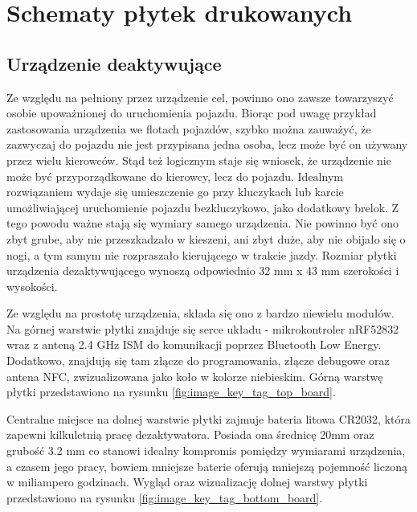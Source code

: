 \chapter{Schematy płytek drukowanych}
\label{boards}

\section{Urządzenie deaktywujące}

Ze względu na pełniony przez urządzenie cel, powinno ono zawsze towarzyszyć osobie upoważnionej do uruchomienia pojazdu. Biorąc pod uwagę przykład zastosowania urządzenia we flotach pojazdów, szybko można zauważyć, że zazwyczaj do pojazdu nie jest przypisana jedna osoba, lecz może być on używany przez wielu kierowców. Stąd też logicznym staje się wniosek, że urządzenie nie może być przyporządkowane do kierowcy, lecz do pojazdu. Idealnym rozwiązaniem wydaje się umieszczenie go przy kluczykach lub karcie umożliwiającej uruchomienie pojazdu bezkluczykowo, jako dodatkowy brelok. Z tego powodu ważne stają się wymiary samego urządzenia. Nie powinno być ono zbyt grube, aby nie przeszkadzało w kieszeni, ani zbyt duże, aby nie obijało się o nogi, a tym samym nie rozpraszało kierującego w trakcie jazdy.
Rozmiar płytki urządzenia dezaktywującego wynoszą odpowiednio 32 mm x 43 mm szerokości i wysokości.

Ze względu na prostotę urządzenia, składa się ono z bardzo niewielu modułów.
Na górnej warstwie płytki znajduje się serce układu - mikrokontroler nRF52832 wraz z anteną 2.4 GHz ISM do komunikacji poprzez Bluetooth Low Energy. Dodatkowo, znajdują się tam złącze do programowania, złącze debugowe oraz antena NFC, zwizualizowana jako koło w kolorze niebieskim. Górną warstwę płytki przedstawiono na rysunku \ref{fig:image_key_tag_top_board}.

Centralne miejsce na dolnej warstwie płytki zajmuje bateria litowa CR2032, która zapewni kilkuletnią pracę dezaktywatora. Posiada ona średnicę 20mm oraz grubość 3.2 mm co stanowi idealny kompromis pomiędzy wymiarami urządzenia, a czasem jego pracy, bowiem mniejsze baterie oferują mniejszą pojemność liczoną w miliampero godzinach. Wygląd oraz wizualizację dolnej warstwy płytki przedstawiono na rysunku \ref{fig:image_key_tag_bottom_board}.

